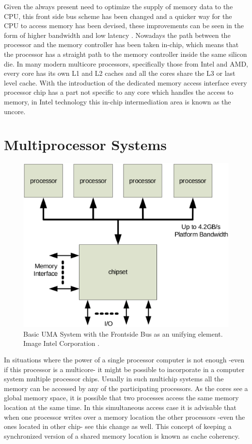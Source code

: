 Given the always present need to optimize the supply of memory data to the CPU, this front side bus scheme has been changed and a quicker way for the CPU to access memory has been devised, these improvements can be seen in the form of higher bandwidth and low latency . Nowadays the path between the processor and the memory controller has been taken in-chip, which means that the processor has a straight path to the memory controller inside the same silicon die. In many modern multicore processors, specifically those from Intel and AMD, every core has its own L1 and L2 caches and all the cores share the L3 or last level cache. With the introduction of the dedicated memory access interface every processor chip has a part not specific to any core which handles the access to memory, in Intel technology this in-chip intermediation area is known as the uncore.

\section{Multiprocessor Systems}\label{section:multiproc}

\begin{figure}
	\centering
		\includegraphics[width=.6\textwidth]{figures/uma1.eps}
		\caption[basic-uma]{Basic UMA System with the Frontside Bus as an unifying element. Image Intel Corporation \cite{qpi-intel}. }
		\label{fig:uma1}
\end{figure}

In situations where the power of a single processor computer is not enough -even if this processor is a multicore- it might be possible to incorporate in a computer system multiple processor chips. Usually in such multichip systems all the memory can be accessed by any of the participating processors. As the cores see a global memory space, it is possible that two processes access the same memory location at the same time. In this simultaneous access case it is advisable that when one processor writes over a memory location the other processors -even the ones located in other chip- see this change as well. This concept of keeping a synchronized version of a shared memory location is known as cache coherency. 


